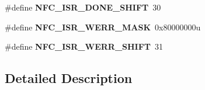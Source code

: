 \begin{DoxyCompactItemize}
\item 
\hypertarget{group___n_f_c___register___masks_ga01a30a1033c2d449be2a3b823a28aefb}{}\#define {\bfseries N\+F\+C\+\_\+\+I\+S\+R\+\_\+\+D\+O\+N\+E\+\_\+\+S\+H\+I\+F\+T}~30\label{group___n_f_c___register___masks_ga01a30a1033c2d449be2a3b823a28aefb}

\item 
\hypertarget{group___n_f_c___register___masks_ga98d7486c7c0c1c48b24a0145e8fc898b}{}\#define {\bfseries N\+F\+C\+\_\+\+I\+S\+R\+\_\+\+W\+E\+R\+R\+\_\+\+M\+A\+S\+K}~0x80000000u\label{group___n_f_c___register___masks_ga98d7486c7c0c1c48b24a0145e8fc898b}

\item 
\hypertarget{group___n_f_c___register___masks_gac7319737930cf8c9eb824964080a4a26}{}\#define {\bfseries N\+F\+C\+\_\+\+I\+S\+R\+\_\+\+W\+E\+R\+R\+\_\+\+S\+H\+I\+F\+T}~31\label{group___n_f_c___register___masks_gac7319737930cf8c9eb824964080a4a26}

\end{DoxyCompactItemize}


\subsection{Detailed Description}
